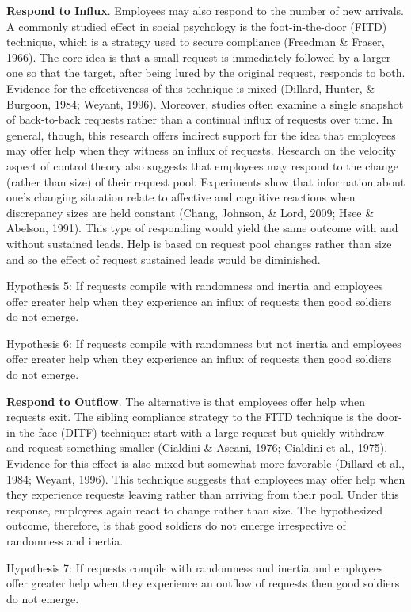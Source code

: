 \documentclass[english,,man]{apa6}
\begin{document}
\textbf{Respond to Influx}. Employees may also respond to the number of new arrivals. A commonly studied effect in social psychology is the foot-in-the-door (FITD) technique, which is a strategy used to secure compliance (Freedman \& Fraser, 1966). The core idea is that a small request is immediately followed by a larger one so that the target, after being lured by the original request, responds to both. Evidence for the effectiveness of this technique is mixed (Dillard, Hunter, \& Burgoon, 1984; Weyant, 1996). Moreover, studies often examine a single snapshot of back-to-back requests rather than a continual influx of requests over time. In general, though, this research offers indirect support for the idea that employees may offer help when they witness an influx of requests. Research on the velocity aspect of control theory also suggests that employees may respond to the change (rather than size) of their request pool. Experiments show that information about one's changing situation relate to affective and cognitive reactions when discrepancy sizes are held constant (Chang, Johnson, \& Lord, 2009; Hsee \& Abelson, 1991). This type of responding would yield the same outcome with and without sustained leads. Help is based on request pool changes rather than size and so the effect of request sustained leads would be diminished.

Hypothesis 5: If requests compile with randomness and inertia and employees offer greater help when they experience an influx of requests then good soldiers do not emerge.

Hypothesis 6: If requests compile with randomness but not inertia and employees offer greater help when they experience an influx of requests then good soldiers do not emerge.

\textbf{Respond to Outflow}. The alternative is that employees offer help when requests exit. The sibling compliance strategy to the FITD technique is the door-in-the-face (DITF) technique: start with a large request but quickly withdraw and request something smaller (Cialdini \& Ascani, 1976; Cialdini et al., 1975). Evidence for this effect is also mixed but somewhat more favorable (Dillard et al., 1984; Weyant, 1996). This technique suggests that employees may offer help when they experience requests leaving rather than arriving from their pool. Under this response, employees again react to change rather than size. The hypothesized outcome, therefore, is that good soldiers do not emerge irrespective of randomness and inertia.

Hypothesis 7: If requests compile with randomness and inertia and employees offer greater help when they experience an outflow of requests then good soldiers do not emerge.
\end{document}
